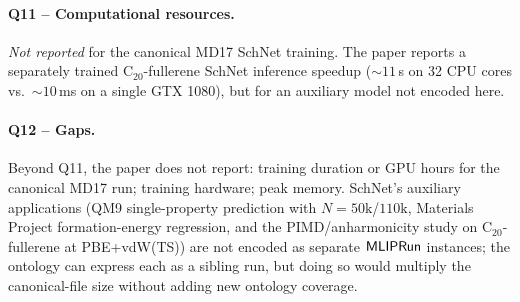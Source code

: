 \paragraph{Q11 -- Computational resources.}
\emph{Not reported} for the canonical MD17 SchNet training. The paper
reports a separately trained C$_{20}$-fullerene SchNet inference
speedup (${\sim}11$\,s on 32 CPU cores vs.\ ${\sim}10$\,ms on a single
GTX 1080), but for an auxiliary model not encoded here.


\paragraph{Q12 -- Gaps.}
Beyond Q11, the paper does not report: training duration or GPU
hours for the canonical MD17 run; training hardware; peak memory.
SchNet's auxiliary applications (QM9 single-property prediction with
$N{=}50\text{k}$/$110\text{k}$, Materials Project formation-energy
regression, and the PIMD/anharmonicity study on C$_{20}$-fullerene at
PBE+vdW(TS)) are not encoded as separate $\mathsf{MLIPRun}$
instances; the ontology can express each as a sibling run, but doing
so would multiply the canonical-file size without adding new
ontology coverage.
